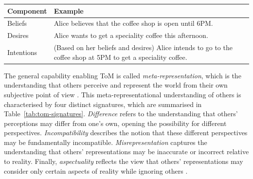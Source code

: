 \begin{ctable}
    \centering
    \begin{tabularx}{\textwidth}{l X}
        \toprule
        \textbf{Component} & \textbf{Example} \\
        \midrule
        Beliefs & Alice believes that the coffee shop is open until 6PM. \\
        \addlinespace
        Desires & Alice wants to get a speciality coffee this afternoon. \\
        \addlinespace
        Intentions & (Based on her beliefs and desires) Alice intends to go to the coffee shop at 5PM to get a speciality coffee. \\
        \bottomrule
    \end{tabularx}
    \caption[Example of the BDI components]{Example illustrating the BDI components of Theory of Mind.}
    \label{tab:bdi-example}
\end{ctable}

The general capability enabling \ac{ToM} is called \textit{meta-representation}, which is the understanding that others perceive and represent the world from their own subjective point of view \parencite{Perner1993}. This meta-representational understanding of others is characterised by four distinct signatures, which are summarised in Table~\ref{tab:tom-signatures}. \textit{Difference} refers to the understanding that others' perceptions may differ from one's own, opening the possibility for different perspectives. \textit{Incompatibility} describes the notion that these different perspectives may be fundamentally incompatible. \textit{Misrepresentation} captures the understanding that others' representations may be inaccurate or incorrect relative to reality. Finally, \textit{aspectuality} reflects the view that others' representations may consider only certain aspects of reality while ignoring others \parencite{Rakoczy2022}.

